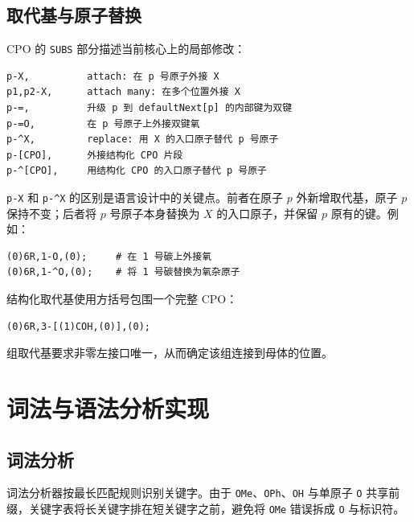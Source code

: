 \documentclass[UTF8,a4paper,11pt]{ctexart}
\begin{document}
\subsection{取代基与原子替换}

CPO 的 \verb|SUBS| 部分描述当前核心上的局部修改：

\begin{lstlisting}[language=mychem]
p-X,          attach: 在 p 号原子外接 X
p1,p2-X,      attach many: 在多个位置外接 X
p-=,          升级 p 到 defaultNext[p] 的内部键为双键
p-=O,         在 p 号原子上外接双键氧
p-^X,         replace: 用 X 的入口原子替代 p 号原子
p-[CPO],      外接结构化 CPO 片段
p-^[CPO],     用结构化 CPO 的入口原子替代 p 号原子
\end{lstlisting}

\verb|p-X| 和 \verb|p-^X| 的区别是语言设计中的关键点。前者在原子 $p$ 外新增取代基，原子 $p$ 保持不变；后者将 $p$ 号原子本身替换为 $X$ 的入口原子，并保留 $p$ 原有的键。例如：

\begin{lstlisting}[language=mychem]
(0)6R,1-O,(0);     # 在 1 号碳上外接氧
(0)6R,1-^O,(0);    # 将 1 号碳替换为氧杂原子
\end{lstlisting}

结构化取代基使用方括号包围一个完整 CPO：

\begin{lstlisting}[language=mychem]
(0)6R,3-[(1)COH,(0)],(0);
\end{lstlisting}

组取代基要求非零左接口唯一，从而确定该组连接到母体的位置。

\section{词法与语法分析实现}

\subsection{词法分析}

词法分析器按最长匹配规则识别关键字。由于 \verb|OMe|、\verb|OPh|、\verb|OH| 与单原子 \verb|O| 共享前缀，关键字表将长关键字排在短关键字之前，避免将 \verb|OMe| 错误拆成 \verb|O| 与标识符。
\end{document}
